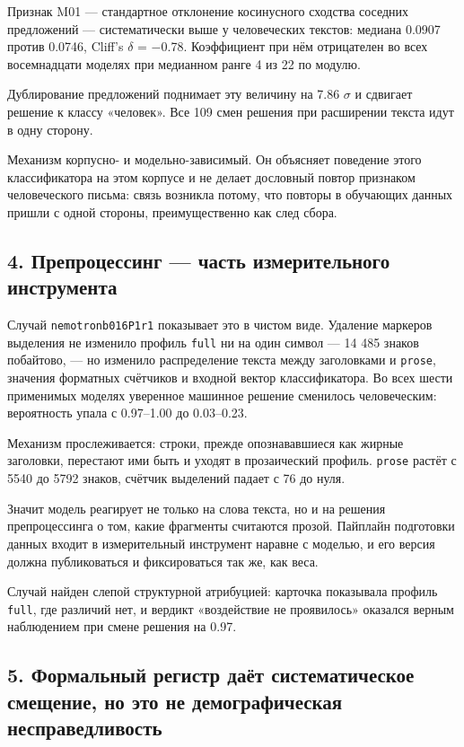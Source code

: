 \documentclass[11pt,a4paper]{article}
\renewcommand{\_}{\textunderscore\allowbreak}
\begin{document}
Признак M01 — стандартное отклонение косинусного сходства соседних предложений —
систематически выше у человеческих текстов: медиана 0.0907 против 0.0746,
Cliff's $\delta$ = $-$0.78. Коэффициент при нём отрицателен во всех восемнадцати моделях
при медианном ранге 4 из 22 по модулю.

Дублирование предложений поднимает эту величину на 7.86 $\sigma$ и сдвигает решение к
классу «человек». Все 109 смен решения при расширении текста идут в одну сторону.

Механизм корпусно- и модельно-зависимый. Он объясняет поведение этого
классификатора на этом корпусе и не делает дословный повтор признаком
человеческого письма: связь возникла потому, что повторы в обучающих данных
пришли с одной стороны, преимущественно как след сбора.

\subsection{4. Препроцессинг — часть измерительного инструмента}

Случай \texttt{nemotron\_b016\_P1\_r1} показывает это в чистом виде. Удаление маркеров
выделения не изменило профиль \texttt{full} ни на один символ — 14 485 знаков побайтово,
— но изменило распределение текста между заголовками и \texttt{prose}, значения форматных
счётчиков и входной вектор классификатора. Во всех шести применимых моделях
уверенное машинное решение сменилось человеческим: вероятность упала с 0.97–1.00
до 0.03–0.23.

Механизм прослеживается: строки, прежде опознававшиеся как жирные заголовки,
перестают ими быть и уходят в прозаический профиль. \texttt{prose} растёт с 5540 до 5792
знаков, счётчик выделений падает с 76 до нуля.

Значит модель реагирует не только на слова текста, но и на решения препроцессинга
о том, какие фрагменты считаются прозой. Пайплайн подготовки данных входит в
измерительный инструмент наравне с моделью, и его версия должна публиковаться и
фиксироваться так же, как веса.

Случай найден слепой структурной атрибуцией: карточка показывала профиль \texttt{full},
где различий нет, и вердикт «воздействие не проявилось» оказался верным
наблюдением при смене решения на 0.97.

\subsection{5. Формальный регистр даёт систематическое смещение, но это не демографическая несправедливость}
\end{document}
